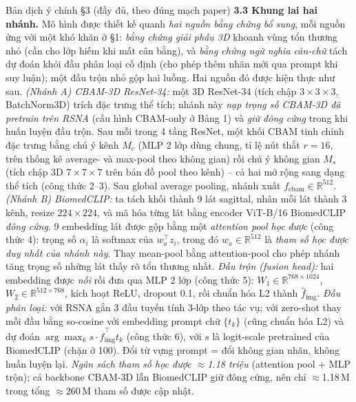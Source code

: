 \documentclass[12pt,a4paper]{article}
\begin{document}
\begin{dichbox}{Bản dịch ý chính §3 (đầy đủ, theo đúng mạch paper)}
\textbf{3.3 Khung lai hai nhánh.} Mô hình được thiết kế quanh \emph{hai nguồn bằng chứng bổ sung}, mỗi nguồn ứng với một khó khăn ở §1: \emph{bằng chứng giải phẫu 3D} khoanh vùng tổn thương nhỏ (cần cho lớp hiếm khi mất cân bằng), và \emph{bằng chứng ngữ nghĩa căn-chữ} tách dự đoán khỏi đầu phân loại cố định (cho phép thêm nhãn mới qua prompt khi suy luận); một đầu trộn nhỏ gộp hai luồng. Hai nguồn đó được hiện thực như sau. \emph{(Nhánh A) CBAM-3D ResNet-34:} một 3D ResNet-34 (tích chập $3\times3\times3$, BatchNorm3D) trích đặc trưng thể tích; nhánh này \emph{nạp trọng số CBAM-3D đã pretrain trên RSNA} (cấu hình CBAM-only ở Bảng 1) và \emph{giữ đông cứng} trong khi huấn luyện đầu trộn. Sau mỗi trong 4 tầng ResNet, một khối CBAM tinh chỉnh đặc trưng bằng chú ý kênh $M_c$ (MLP 2 lớp dùng chung, tỉ lệ nút thắt $r=16$, trên thống kê average- và max-pool theo không gian) rồi chú ý không gian $M_s$ (tích chập 3D $7\times7\times7$ trên bản đồ pool theo kênh) -- cả hai mở rộng sang dạng thể tích (công thức 2--3). Sau global average pooling, nhánh xuất $f_{\text{cbam}}\in\mathbb{R}^{512}$. \emph{(Nhánh B) BiomedCLIP:} ta tách khối thành 9 lát sagittal, nhân mỗi lát thành 3 kênh, resize $224\times224$, và mã hóa từng lát bằng encoder ViT-B/16 BiomedCLIP \emph{đông cứng}. 9 embedding lát được gộp bằng một \emph{attention pool học được} (công thức 4): trọng số $\alpha_i$ là softmax của $w_a^\top z_i$, trong đó $w_a\in\mathbb{R}^{512}$ là \emph{tham số học được duy nhất của nhánh này}. Thay mean-pool bằng attention-pool cho phép nhánh tăng trọng số những lát thấy rõ tổn thương nhất. \emph{Đầu trộn (fusion head):} hai embedding được \emph{nối} rồi đưa qua MLP 2 lớp (công thức 5): $W_1\in\mathbb{R}^{768\times1024}$, $W_2\in\mathbb{R}^{512\times768}$, kích hoạt ReLU, dropout 0.1, rồi chuẩn hóa L2 thành $\hat f_{\text{img}}$. \emph{Đầu phân loại:} với RSNA gắn 3 đầu tuyến tính 3-lớp theo tác vụ; với zero-shot thay mỗi đầu bằng so-cosine với embedding prompt chữ $\{t_k\}$ (cũng chuẩn hóa L2) và dự đoán $\arg\max_k s\cdot\hat f_{\text{img}}^\top t_k$ (công thức 6), với $s$ là logit-scale pretrained của BiomedCLIP (chặn ở 100). Đổi từ vựng prompt = đổi không gian nhãn, không huấn luyện lại. \emph{Ngân sách tham số học được $\approx$1.18 triệu} (attention pool + MLP trộn); cả backbone CBAM-3D lẫn BiomedCLIP giữ đông cứng, nên chỉ $\approx$1.18\,M trong tổng $\approx$260\,M tham số được cập nhật.


\end{dichbox}
\end{document}
